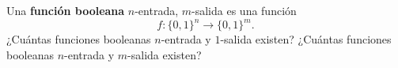 \begin{statement}{7}
  Una \textbf{funci\'on booleana} $n$-entrada, $m$-salida es una funci\'on
  \[
    f: \{0, 1\}^n \to \{0, 1\}^m.
  \]
  ¿Cu\'antas funciones booleanas $n$-entrada y $1$-salida existen?
  ¿Cu\'antas funciones booleanas $n$-entrada y $m$-salida existen?
\end{statement}